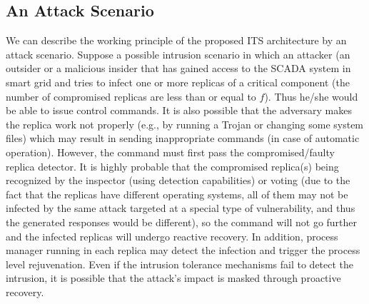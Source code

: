 \documentclass[preprint,number,12pt]{elsarticle}
\begin{document}
\subsection{An Attack Scenario}
We can describe the working principle of the proposed ITS architecture by an attack scenario. Suppose a possible intrusion scenario in which an attacker (an outsider or a malicious insider that has gained access to the SCADA system in smart grid and tries to infect one or more replicas of a critical component (the number of compromised replicas are less than or equal to $f$). Thus he/she would be able to issue control commands. It is also possible that the adversary makes the replica work not properly (e.g., by running a Trojan or changing some system files) which may result in sending inappropriate commands (in case of automatic operation). However, the command must first pass the compromised/faulty replica detector. It is highly probable that the compromised replica(s) being recognized by the inspector (using detection capabilities) or voting (due to the fact that the replicas have different operating systems, all of them may not be infected by the same attack targeted at a special type of vulnerability, and thus the generated responses would be different), so the command will not go further and the infected replicas will undergo reactive recovery. In addition, process manager running in each replica may detect the infection and trigger the process level rejuvenation. Even if the intrusion tolerance mechanisms fail to detect the intrusion, it is possible that the attack's impact is masked through proactive recovery.
\end{document}
